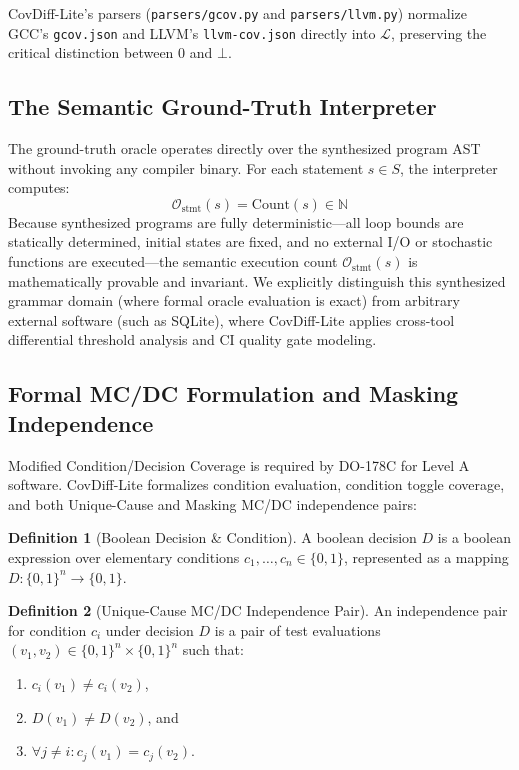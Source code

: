 \documentclass[sigconf,review,anonymous=false]{acmart}
\theoremstyle{definition}
\newtheorem{definition}{Definition}
\begin{document}
CovDiff-Lite's parsers (\texttt{parsers/gcov.py} and \texttt{parsers/llvm.py}) normalize GCC's \texttt{gcov.json} and LLVM's \texttt{llvm-cov.json} directly into $\mathcal{L}$, preserving the critical distinction between $0$ and $\bot$.

\subsection{The Semantic Ground-Truth Interpreter}
The ground-truth oracle operates directly over the synthesized program AST without invoking any compiler binary. For each statement $s \in S$, the interpreter computes:
\begin{equation}
\mathcal{O}_{\text{stmt}}(s) = \text{Count}(s) \in \mathbb{N}
\end{equation}
Because synthesized programs are fully deterministic—all loop bounds are statically determined, initial states are fixed, and no external I/O or stochastic functions are executed—the semantic execution count $\mathcal{O}_{\text{stmt}}(s)$ is mathematically provable and invariant. We explicitly distinguish this synthesized grammar domain (where formal oracle evaluation is exact) from arbitrary external software (such as SQLite), where CovDiff-Lite applies cross-tool differential threshold analysis and CI quality gate modeling.

\subsection{Formal MC/DC Formulation and Masking Independence}
Modified Condition/Decision Coverage is required by DO-178C for Level A software. CovDiff-Lite formalizes condition evaluation, condition toggle coverage, and both Unique-Cause and Masking MC/DC independence pairs:

\begin{definition}[Boolean Decision \& Condition]
A boolean decision $D$ is a boolean expression over elementary conditions $c_1, \dots, c_n \in \{0, 1\}$, represented as a mapping $D: \{0, 1\}^n \to \{0, 1\}$.
\end{definition}

\begin{definition}[Unique-Cause MC/DC Independence Pair]
An independence pair for condition $c_i$ under decision $D$ is a pair of test evaluations $(v_1, v_2) \in \{0, 1\}^n \times \{0, 1\}^n$ such that:
\begin{enumerate}
    \item $c_i(v_1) \neq c_i(v_2)$,
    \item $D(v_1) \neq D(v_2)$, and
    \item $\forall j \neq i: c_j(v_1) = c_j(v_2)$.
\end{enumerate}
\end{definition}
\end{document}
